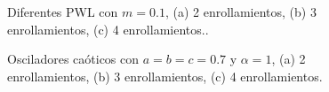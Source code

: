 \documentclass[10pt,a4paper]{article}
\begin{document}
\begin{figure}[htp]
	\centering
	\caption{Diferentes PWL con $m = 0.1$, (a) 2 enrollamientos, (b) 3 enrollamientos, (c) 4 enrollamientos..}
	\label{fig:pwl}
\end{figure}


\begin{figure}[htp]
	\centering
	\caption{Osciladores caóticos con $a =b = c = 0.7$ y $\alpha = 1$, (a) 2 enrollamientos, (b) 3 enrollamientos, (c) 4 enrollamientos.}
	\label{fig:osciladores}
\end{figure}
\end{document}
